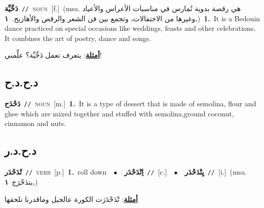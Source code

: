 \documentclass[10pt,a4paper,twoside]{article} %
\begin{document}
\begin{multicols}{2}
{\setlength\topsep{0pt}\textbf{\foreignlanguage{arabic}{دَحِّيِّة}}\ {\color{gray}\texttt{//}\color{black}}\ \textsc{noun}\ [f.]\ \color{gray}(msa. \foreignlanguage{arabic}{هي رقصة بدوية تُمارس في مناسبات الأعراس والأعياد وغيرها من الاحتفالات، وتجمع بين فن الشعر والرقص والأهازيج.}~\foreignlanguage{arabic}{\textbf{١.}})\color{black}\ \textbf{1.}~It is a Bedouin dance practiced on special occasions like weddings, feasts and other celebrations. It combines the art of poetry, dance and songs.\  \begin{flushright}\color{gray}\foreignlanguage{arabic}{\textbf{\underline{\foreignlanguage{arabic}{أمثلة}}}: بتعرف تعمل دَحِّيِّة؟ علِّمني!}\end{flushright}\color{black}} \vspace{2mm}

\vspace{-3mm}
\subsection*{\color{blue}\foreignlanguage{arabic}{د.ح.د.ح}\color{blue}{}} 

{\setlength\topsep{0pt}\textbf{\foreignlanguage{arabic}{دَحْدَح}}\ {\color{gray}\texttt{//}\color{black}}\ \textsc{noun}\ [m.]\ \textbf{1.}~It is a type of dessert that is made of semolina, flour and ghee which are mixed together and stuffed with semolina,ground coconut, cinnamon and nuts.\ } \vspace{2mm}

\vspace{-3mm}
\subsection*{\color{blue}\foreignlanguage{arabic}{د.ح.د.ر}\color{blue}{}} 

{\setlength\topsep{0pt}\textbf{\foreignlanguage{arabic}{تْدَحْدَر}}\ {\color{gray}\texttt{//}\color{black}}\ \textsc{verb}\ [p.]\ \textbf{1.}~roll down\ \ $\bullet$\ \ \setlength\topsep{0pt}\textbf{\foreignlanguage{arabic}{اِتْدَحْدَر}}\ {\color{gray}\texttt{//}\color{black}}\ [c.]\ \ $\bullet$\ \ \setlength\topsep{0pt}\textbf{\foreignlanguage{arabic}{يِتْدَحْدَر}}\ {\color{gray}\texttt{//}\color{black}}\ [i.]\ \color{gray}(msa. \foreignlanguage{arabic}{يتدَحْرَج}~\foreignlanguage{arabic}{\textbf{١.}})\color{black}\  \begin{flushright}\color{gray}\foreignlanguage{arabic}{\textbf{\underline{\foreignlanguage{arabic}{أمثلة}}}: تْدَحْدَرَت الكورة عالجبل وماقدرنا نلحقها}\end{flushright}\color{black}} \vspace{2mm}


\end{multicols}
\end{document}
